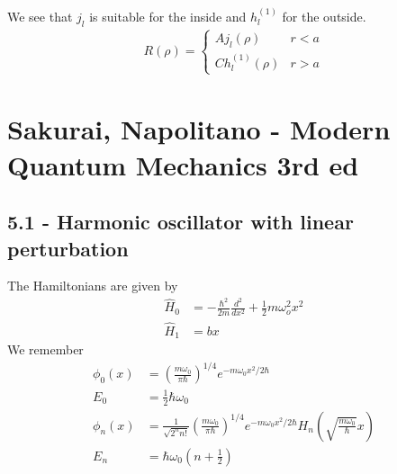 \documentclass[10pt,a4paper]{book}
\theoremstyle{definition}
\begin{document}
We see that $j_l$ is suitable for the inside and $h^{(1)}_l$ for the outside.
\begin{align}
R(\rho)=\left\{\begin{matrix}
Aj_l(\rho) & r<a\\
Ch^{(1)}_l(\rho) & r>a
\end{matrix}\right.
\end{align}





\section{{\sc Sakurai, Napolitano} - Modern Quantum Mechanics 3rd ed}
\subsection{5.1 - Harmonic oscillator with linear perturbation}
The Hamiltonians are given by
\begin{align}
\hat{H}_0&=-\frac{\hbar^2}{2m}\frac{d^2}{dx^2}+\frac{1}{2}m\omega_o^2x^2\\
\hat{H}_1&=bx
\end{align}
We remember
\begin{align}
\phi_0(x)&=\left(\frac{m\omega_0}{\pi\hbar}\right)^{1/4}e^{-m\omega_0x^2/2\hbar}\\
E_0&=\frac{1}{2}\hbar\omega_0\\
\phi_n(x)&=\frac{1}{\sqrt{2^n n!}}\left(\frac{m\omega_0}{\pi\hbar}\right)^{1/4}e^{-m\omega_0x^2/2\hbar}H_n\left(\sqrt{\frac{m\omega_0}{\hbar}}x\right)\\
E_n&=\hbar\omega_0\left(n+\frac{1}{2}\right)
\end{align}
\end{document}

